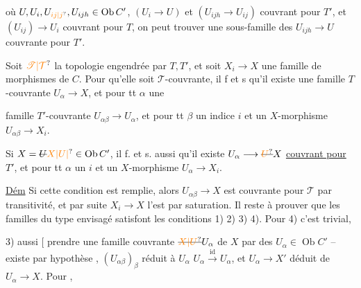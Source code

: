 où $U,U_i,U_{\unsure{ij|j}},U_{ijh}\in\operatorname{Ob} C'$, $(U_i\longrightarrow U)$ et $(U_{ijh}\longrightarrow U_{ij})$ couvrant pour  $T'$, et $(U_{ij})\longrightarrow U_i$ couvrant pour $T$, on peut trouver une sous-famille des $U_{ijh}\longrightarrow U$ couvrante pour $T'$.

Soit $\unsure{\mathscr T|\mathcal T}$ la topologie engendrée par $T,T'$,  et soit $X_i\longrightarrow X$ une famille de morphismes de $C$. Pour qu'elle soit $\mathscr T$-couvrante, il f et s qu'il existe une famille $T$-couvrante $U_\alpha\longrightarrow X$,  et pour tt $\alpha$ une


famille $T'$-couvrante $U_{\alpha\beta}\longrightarrow U_\alpha$, et pour tt $\beta$ un indice $i$ et un $X$-morphisme $U_{\alpha\beta}\longrightarrow X_i$.

 Si $X=\deleted{U}{\unsure{X|U|{}}}\in\operatorname{Ob}C'$, il f. et s. aussi qu'il existe $U_\alpha\longrightarrow\deleted{\unsure{U}}X$ \uline{couvrant pour $T'$},  et pour tt $\alpha$ un $i$  et un $X$-morphisme $U_\alpha\longrightarrow X_i$.


\uline{Dém} Si cette condition est remplie, alors $U_{\alpha\beta}\longrightarrow X$ est couvrante pour $\mathscr T$ par transitivité, et par suite $X_i\longrightarrow X$ l'est par saturation. Il reste à prouver que les familles du type envisagé satisfont les conditions 1) 2) 3) 4). Pour 4) c'est trivial,

 3) aussi [ prendre une famille couvrante $\deleted{\unsure{X|U}}U_\alpha$ de $X$ par des $U_\alpha\in\operatorname{Ob}C'$ -- existe par hypothèse  , $(U_{\alpha\beta})_\beta$ réduit à $U_\alpha$ \unsure{---} $U_\alpha\xrightarrow{\mathrm{id}}U_\alpha$, et $U_\alpha\longrightarrow X'$ déduit de $U_\alpha\longrightarrow X$. Pour ,

